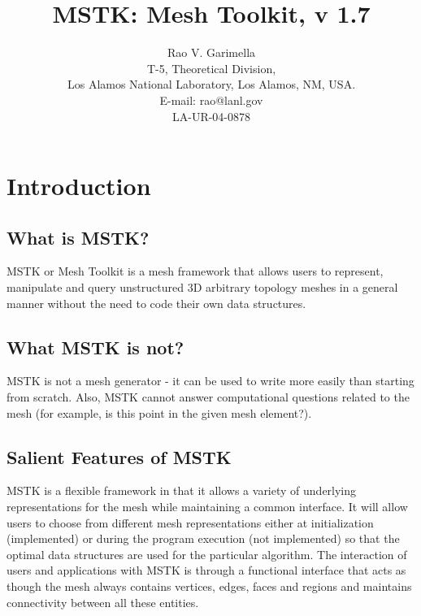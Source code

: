 \documentclass[12pt]{article}
\begin{document}
\title{MSTK: Mesh Toolkit, v 1.7} 


\author{Rao V. Garimella \\
  T-5, Theoretical Division, \\
  Los Alamos National Laboratory, Los Alamos, NM, USA. \\ E-mail:
  rao@lanl.gov \\
  \vspace{5em}
  LA-UR-04-0878}

\maketitle

\thispagestyle{empty}
\setlength{\parindent}{0.0in}
\setlength{\parskip}{0.5em}

\newpage
\section{Introduction}

\subsection{What is MSTK?}
MSTK or Mesh Toolkit is a mesh framework that allows users to
represent, manipulate and query unstructured 3D arbitrary topology
meshes in a general manner without the need to code their own data
structures. 

\subsection{What MSTK is not?}

MSTK is not a mesh generator - it can be used to write more easily
than starting from scratch. Also, MSTK cannot answer computational
questions related to the mesh (for example, is this point in the given
mesh element?).

\subsection{Salient Features of MSTK}

MSTK is a flexible framework in that it allows a variety
of underlying representations for the mesh while maintaining a common
interface. It will allow users to choose from different mesh
representations either at initialization (implemented) or during the
program execution (not implemented) so that the optimal data
structures are used for the particular algorithm. The interaction of
users and applications with MSTK is through a functional interface
that acts as though the mesh always contains vertices, edges, faces
and regions and maintains connectivity between all these entities.
\end{document}
